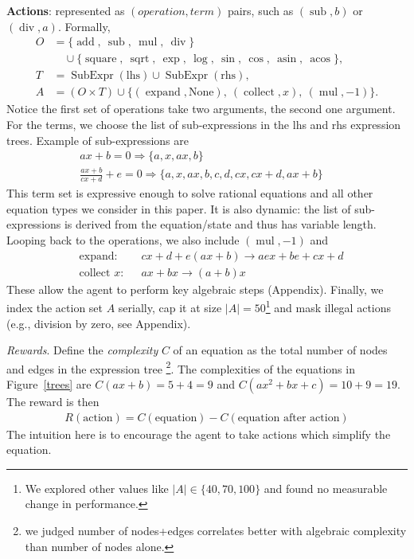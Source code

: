 \documentclass{article}
\theoremstyle{plain}
\theoremstyle{definition}
\theoremstyle{remark}
\newcommand{\op}[1]{\operatorname{#1}}
\newcommand{\SubExpr}{\operatorname{SubExpr}}
\begin{document}
\textbf{Actions}: represented as $(operation, term)$ pairs, such as $(\op{sub}, b)$ or $(\op{div}, a)$. Formally,
\begin{align}
O &= \{\op{add},\ \op{sub},\ \op{mul},\ \op{div}\} \nonumber \\
  &\quad \cup \{\op{square},\ \op{sqrt},\ \op{exp},\ \op{log},\ \op{sin},\ \op{cos},\ \op{asin},\ \op{acos}\}, \\
T &= \SubExpr(\text{lhs}) \cup \SubExpr(\text{rhs}), \\
A &= (O \times T) \cup \{(\op{expand}, \text{None}),\ (\op{collect}, x),\ (\op{mul}, -1)\}.
\end{align}
Notice the first set of operations take two arguments, the second one argument. For the terms, we choose the list of sub-expressions in the lhs and rhs expression trees. Example of sub-expressions are
\begin{align}
& ax+b=0 \Rightarrow \{a, x, ax, b\} & \quad  \\
& \frac{ax+b}{cx+d}+e=0 \Rightarrow \{a, x, ax, b, c, d, cx, cx+d, ax+b\} 
\end{align}
This term set is expressive enough to solve rational equations and all other equation types we consider in this paper. It is also dynamic: the list of sub-expressions is derived from the equation/state and thus has variable length. Looping back to the operations, we also include $(\op{mul}, -1)$ and
\begin{align*}
    & \text{expand:} && cx + d + e(ax + b) \to aex + be + cx + d \\
    & \text{collect $x$:} && ax + bx \to (a + b)x
\end{align*}
These allow the agent to perform key algebraic steps (Appendix). Finally, we index the action set \(A\) serially, cap it at size \(|A|=50\)\footnote{We explored other values like $|A| \in \{40, 70, 100\}$ and found no measurable change in performance.} and mask illegal actions (e.g., division by zero, see Appendix). 

\textit{Rewards}. Define the \textit{complexity} $C$ of an equation as the total number of nodes and edges in the expression tree \footnote{we judged number of nodes+edges correlates better with algebraic complexity than number of nodes alone.}. The complexities of the equations in Figure~\ref{trees} are $C(ax+b) = 5 + 4 = 9$ and $C(ax^2 + bx + c) =  10 + 9 = 19$. The reward is then
\begin{align}
    R(\text{action}) = C(\text{equation}) - C(\text{equation after action})
\end{align}
The intuition here is to encourage the agent to take actions which simplify the equation. 
\end{document}
